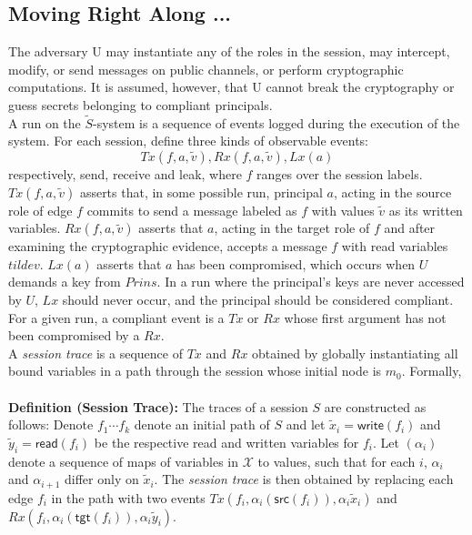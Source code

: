 \documentclass[a4paper,10pt]{article}
\begin{document}
\subsection{Moving Right Along ...}
The adversary U may instantiate any of the roles in the session, may intercept, modify, or send messages
on public channels, or perform cryptographic computations.  It is assumed, however, that U cannot
break the cryptography or guess secrets belonging to compliant principals.\\
A run on the $\tilde{S}$-system is a sequence of events logged during the execution of the system.
For each session, define three kinds of observable events:\\
\[
 Tx(f, a, \tilde{v}), Rx(f, a, \tilde{v}), Lx(a)
\]
respectively, send, receive and leak, where $f$ ranges over the session labels.  $Tx(f, a, \tilde{v})$
asserts that, in some possible run, principal $a$, acting in the source role of edge $f$ commits
to send a message labeled as $f$ with values $\tilde{v}$ as its written variables.
$Rx(f, a, \tilde{v})$ asserts that $a$, acting in the target role of $f$ and after examining the
cryptographic evidence, accepts a message $f$ with read variables $tilde{v}$.  $Lx(a)$ asserts
that $a$ has been compromised, which occurs when $U$ demands a key from $Prins$.  In a run where the
principal's keys are never accessed by $U$, $Lx$ should never occur, and the principal should be
considered compliant.  For a given run, a compliant event is a $Tx$ or $Rx$ whose first argument
has not been compromised by a $Rx$.\\

A \emph{session trace} is a sequence of $Tx$ and $Rx$ obtained by globally instantiating all bound
variables in a path through the session whose initial node is $m_0$.  Formally,\\
\\
\textbf{Definition (Session Trace):} The traces of a session $S$ are constructed as follows:
Denote $f_1 \cdots f_k$ denote an initial path of $S$ and let $\tilde{x}_i = \textsf{write}(f_i)$ and
$\tilde{y}_i = \textsf{read}(f_i)$ be the respective read and written variables for $f_i$.  Let
$(\alpha_i)$ denote a sequence of maps of variables in $\mathcal{X}$ to values, such that for each
$i$, $\alpha_i$ and $\alpha_{i+1}$ differ only on $\tilde{x}_i$.
The \emph{session trace} is then obtained by replacing each edge $f_i$ in the path with two events
$Tx(f_i, \alpha_i(\textsf{src}(f_i)), \alpha_i\tilde{x}_i)$ and
$Rx(f_i, \alpha_i(\textsf{tgt}(f_i)), \alpha_i\tilde{y}_i)$.\\
\end{document}
